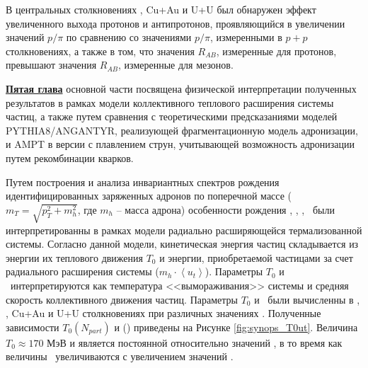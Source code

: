 \begin{comment}
\begin{figure}[] 
	\centerfloat
	\includegraphics [width=0.7\linewidth]{Results/DrawMesons_small.png}
	\caption{Значения факторов ядерной модификации ($R_{AB}$), измеренные для легких адронов(\pipm, \Kpm, \prots, $\pi^{0}$, $\phi$) в центральных и периферических столкновениях \pal \ и \heau.} 
	\label{img:synops_DrawMesonsSmall}
\end{figure}

\begin{figure}[] 
	\centerfloat
	\includegraphics [width=0.7\linewidth]{Results/DrawMesons_large.png}
	\caption{Значения факторов ядерной модификации ($R_{AB}$), измеренные для легких адронов(\pipm, \Kpm, \prots, $\pi^{0}$, $\phi$) в центральных и периферических столкновениях Cu+Au и U+U.} 
	\label{img:synops_DrawMesonsLarge}
\end{figure}
\end{comment}

В центральных столкновениях \heau, Cu+Au и U+U был обнаружен эффект увеличенного выхода протонов и антипротонов, проявляющийся в увеличении значений $p/\pi$ по сравнению со значениями $p/\pi$, измеренными в $p+p$ столкновениях, а также в том, что значения $R_{AB}$, измеренные для протонов, превышают значения $R_{AB}$, измеренные для мезонов. 


\underline{\textbf{Пятая глава}} основной части посвящена физической интерпретации полученных результатов в рамках модели коллективного теплового расширения системы частиц, а также путем сравнения с теоретическими предсказаниями моделей PYTHIA8/ANGANTYR, реализующей фрагментационную модель адронизации, и AMPT в версии с плавлением струн, учитывающей возможность адронизации путем рекомбинации кварков.

Путем построения и анализа инвариантных спектров рождения идентифицированных заряженных адронов по поперечной массе ($m_T = \sqrt{p_T^2 +m_h^2}$, где $m_h$ -- масса адрона) особенности рождения \pipm, \Kpm, \prot, \aprot \ были интерпретированны в рамках модели радиально расширяющейся термализованной системы. Согласно данной модели, кинетическая энергия частиц складывается из энергии их теплового движения $T_0$ и энергии, приобретаемой частицами за счет радиального расширения системы ($m_h \cdot \left< u_t\right>$). Параметры $T_0$ и \ut \  интерпретируются как температура <<вымораживания>> системы и средняя скорость коллективного движения частиц. Параметры $T_{0}$ и \ut \ были вычисленны в \pal, \heau, Cu+Au и U+U столкновениях при различных значениях \Npart. 
Полученные зависимости $T_{0}(N_{part})$ и \ut(\Npart) приведены на Рисунке \ref{fig:synops_T0ut}. Величина $T_{0}\approx170$ МэВ и является постоянной относительно значений \Npart, в то время как величины \ut \ увеличиваются с увеличением значений \Npart.

